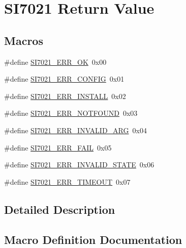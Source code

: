 \hypertarget{group__SI7021__RT__VALUE}{}\section{S\+I7021 Return Value}
\label{group__SI7021__RT__VALUE}
\subsection*{Macros}
\begin{DoxyCompactItemize}
\item 
\#define \hyperlink{group__SI7021__RT__VALUE_ga04cef12730209bc72277b64111308b42}{S\+I7021\+\_\+\+E\+R\+R\+\_\+\+OK}~0x00
\item 
\#define \hyperlink{group__SI7021__RT__VALUE_ga0abfa8d0b3297244d470fcdbce8e39da}{S\+I7021\+\_\+\+E\+R\+R\+\_\+\+C\+O\+N\+F\+IG}~0x01
\item 
\#define \hyperlink{group__SI7021__RT__VALUE_ga1a536c4aff63acd66547e006b587841b}{S\+I7021\+\_\+\+E\+R\+R\+\_\+\+I\+N\+S\+T\+A\+LL}~0x02
\item 
\#define \hyperlink{group__SI7021__RT__VALUE_ga277249c1e2c9ac97e4bec42c79ad4e49}{S\+I7021\+\_\+\+E\+R\+R\+\_\+\+N\+O\+T\+F\+O\+U\+ND}~0x03
\item 
\#define \hyperlink{group__SI7021__RT__VALUE_gad1c1ac433562f82e632c21f92c0fd4a3}{S\+I7021\+\_\+\+E\+R\+R\+\_\+\+I\+N\+V\+A\+L\+I\+D\+\_\+\+A\+RG}~0x04
\item 
\#define \hyperlink{group__SI7021__RT__VALUE_ga7cc0cccf705f1f1807d09abc3d1bea14}{S\+I7021\+\_\+\+E\+R\+R\+\_\+\+F\+A\+IL}~0x05
\item 
\#define \hyperlink{group__SI7021__RT__VALUE_gadf36521836ea146264b0db90fd02fb45}{S\+I7021\+\_\+\+E\+R\+R\+\_\+\+I\+N\+V\+A\+L\+I\+D\+\_\+\+S\+T\+A\+TE}~0x06
\item 
\#define \hyperlink{group__SI7021__RT__VALUE_gaf3c553ace8f63aa562e2263c47a1b5ed}{S\+I7021\+\_\+\+E\+R\+R\+\_\+\+T\+I\+M\+E\+O\+UT}~0x07
\end{DoxyCompactItemize}


\subsection{Detailed Description}


\subsection{Macro Definition Documentation}
\mbox{\label{group__SI7021__RT__VALUE_ga0abfa8d0b3297244d470fcdbce8e39da}} 
